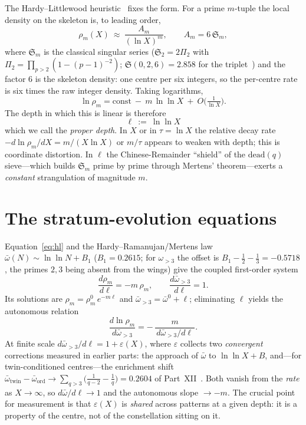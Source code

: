 \documentclass[11pt]{article}
\begin{document}
The Hardy--Littlewood heuristic~\cite{HL} fixes the form. For a prime
$m$-tuple the local density on the skeleton is, to leading order,
\begin{equation}\label{eq:hl}
  \rho_m(X)\ \approx\ \frac{A_m}{(\ln X)^{m}},\qquad
  A_m=6\,\mathfrak{S}_m,
\end{equation}
where $\mathfrak{S}_m$ is the classical singular series ($\mathfrak{S}_2=2\Pi_2$
with $\Pi_2=\prod_{p>2}(1-(p-1)^{-2})$; $\mathfrak{S}(0,2,6)=2.858$ for the
triplet~\cite{ChenXV}) and the factor $6$ is the skeleton density: one centre per
six integers, so the per-centre rate is six times the raw integer density. Taking
logarithms,
\[
  \ln\rho_m = \mathrm{const}\ -\ m\,\ln\ln X\ +\ O\!\Big(\tfrac1{\ln X}\Big).
\]
The depth in which this is linear is therefore
\begin{equation}\label{eq:depth}
  \boxed{\ \ell\ :=\ \ln\ln X\ }
\end{equation}
which we call the \emph{proper depth}. In $X$ or in $\tau=\ln X$ the relative
decay rate $-d\ln\rho_m/dX=m/(X\ln X)$ or $m/\tau$ appears to weaken with depth;
this is coordinate distortion. In $\ell$ the Chinese-Remainder ``shield'' of the
$\mathrm{dead}(q)$ sieve---which builds $\mathfrak{S}_m$ prime by prime through
Mertens' theorem---exerts a \emph{constant} strangulation of magnitude $m$.

\section{The stratum-evolution equations}

Equation~\eqref{eq:hl} and the Hardy--Ramanujan/Mertens law
$\bar\omega(N)\sim\ln\ln N+B_1$ ($B_1=0.2615$; for $\omega_{>3}$ the offset is
$B_1-\tfrac12-\tfrac13=-0.5718$, the primes $2,3$ being absent from the wings)
give the coupled first-order system
\begin{equation}\label{eq:flow}
  \frac{d\rho_m}{d\ell}=-m\,\rho_m,\qquad
  \frac{d\bar\omega_{>3}}{d\ell}=1 .
\end{equation}
Its solutions are $\rho_m=\rho_m^{0}\,e^{-m\ell}$ and
$\bar\omega_{>3}=\bar\omega^{0}+\ell$; eliminating $\ell$ yields the autonomous
relation
\begin{equation}\label{eq:auto}
  \frac{d\ln\rho_m}{d\bar\omega_{>3}}=-\,\frac{m}{\,d\bar\omega_{>3}/d\ell\,}.
\end{equation}
At finite scale $d\bar\omega_{>3}/d\ell=1+\varepsilon(X)$, where $\varepsilon$
collects two \emph{convergent} corrections measured in earlier parts: the
approach of $\bar\omega$ to $\ln\ln X+B$, and---for twin-conditioned
centres---the enrichment shift $\bar\omega_{\mathrm{twin}}-\bar\omega_{\mathrm{ord}}
\to\sum_{q>3}\!\big(\tfrac1{q-2}-\tfrac1q\big)=0.2604$ of Part~XII~\cite{ChenXII}.
Both vanish from the \emph{rate} as $X\to\infty$, so $d\bar\omega/d\ell\to1$ and
the autonomous slope $\to-m$. The crucial point for measurement is that
$\varepsilon(X)$ is \emph{shared} across patterns at a given depth: it is a
property of the centre, not of the constellation sitting on it.
\end{document}
